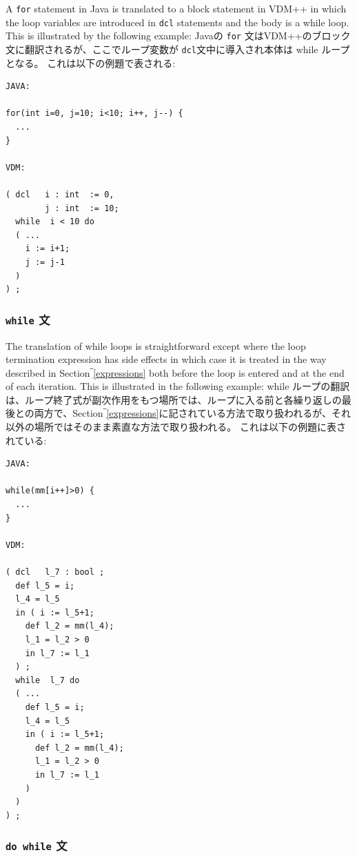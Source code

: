 \documentclass[\pformat,12pt]{jarticle}
\begin{document}
A \texttt{for} statement in Java is translated to a block statement in
VDM++ in which the loop variables are introduced in \texttt{dcl}
statements and the body is a while loop. This is illustrated by the
following example: 
Javaの \texttt{for} 文はVDM++のブロック文に翻訳されるが、ここでループ変数が \texttt{dcl}文中に導入され本体は while ループとなる。
これは以下の例題で表される: 

\begin{small}
\begin{verbatim}
JAVA:

for(int i=0, j=10; i<10; i++, j--) {
  ...
}

VDM:

( dcl   i : int  := 0,
        j : int  := 10;
  while  i < 10 do  
  ( ...
    i := i+1;
    j := j-1
  ) 
) ;
\end{verbatim}
\end{small}

\subsubsection{\texttt{while} 文}

The translation of while loops is straightforward except where the
loop termination expression has side effects in which case it is
treated in the way described in Section‾\ref{expressions} both before
the loop is entered and at the end of each iteration. This is
illustrated in the following example:
while ループの翻訳は、ループ終了式が副次作用をもつ場所では、ループに入る前と各繰り返しの最後との両方で、Section‾\ref{expressions}に記されている方法で取り扱われるが、それ以外の場所ではそのまま素直な方法で取り扱われる。
これは以下の例題に表されている:

\begin{small}
\begin{verbatim}
JAVA:

while(mm[i++]>0) {
  ...
}

VDM:

( dcl   l_7 : bool ;
  def l_5 = i;
  l_4 = l_5
  in ( i := l_5+1;
    def l_2 = mm(l_4);
    l_1 = l_2 > 0
    in l_7 := l_1
  ) ;
  while  l_7 do  
  ( ...
    def l_5 = i;
    l_4 = l_5
    in ( i := l_5+1;
      def l_2 = mm(l_4);
      l_1 = l_2 > 0
      in l_7 := l_1
    ) 
  ) 
) ;
\end{verbatim}
\end{small}

\subsubsection{\texttt{do while} 文}
\end{document}

